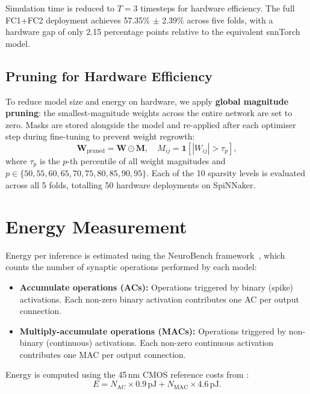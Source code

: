 Simulation time is reduced to $T = 3$ timesteps for hardware efficiency. The full FC1+FC2 deployment achieves 57.35\% $\pm$ 2.39\% across five folds, with a hardware gap of only 2.15 percentage points relative to the equivalent snnTorch model.

\subsection{Pruning for Hardware Efficiency}
\label{ssec:pruning}

To reduce model size and energy on hardware, we apply \textbf{global magnitude pruning}: the smallest-magnitude weights across the entire network are set to zero. Masks are stored alongside the model and re-applied after each optimiser step during fine-tuning to prevent weight regrowth:
\begin{equation}
\label{eq:pruning}
\mathbf{W}_{\text{pruned}} = \mathbf{W} \odot \mathbf{M}, \quad M_{ij} = \mathbf{1}\!\left[|W_{ij}| > \tau_p\right],
\end{equation}
where $\tau_p$ is the $p$-th percentile of all weight magnitudes and $p \in \{50, 55, 60, 65, 70, 75, 80, 85, 90, 95\}$. Each of the 10 sparsity levels is evaluated across all 5 folds, totalling 50 hardware deployments on SpiNNaker.

\section{Energy Measurement}
\label{sec:energy}

Energy per inference is estimated using the NeuroBench framework~\citep{yik2025neurobench}, which counts the number of synaptic operations performed by each model:

\begin{itemize}[nosep]
    \item \textbf{Accumulate operations (ACs):} Operations triggered by binary (spike) activations. Each non-zero binary activation contributes one AC per output connection.
    \item \textbf{Multiply-accumulate operations (MACs):} Operations triggered by non-binary (continuous) activations. Each non-zero continuous activation contributes one MAC per output connection.
\end{itemize}

Energy is computed using the 45\,nm CMOS reference costs from \citet{horowitz2014energy}:
\begin{equation}
\label{eq:energy}
E = N_{\text{AC}} \times 0.9\,\text{pJ} + N_{\text{MAC}} \times 4.6\,\text{pJ}.
\end{equation}

